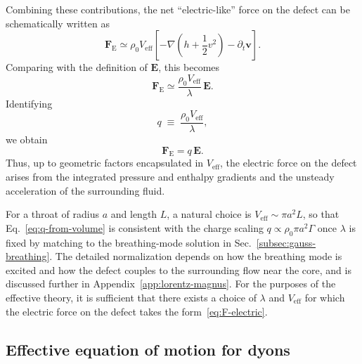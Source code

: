 \documentclass[11pt]{article}
\begin{document}
Combining these contributions, the net ``electric-like'' force on the defect can be schematically written as
\begin{equation}
\mathbf{F}_{\mathrm{E}}
\simeq \rho_0 V_{\mathrm{eff}}
\left[-\nabla\left(h + \frac{1}{2}v^2\right) - \partial_t \mathbf{v}\right].
\end{equation}
Comparing with the definition of $\mathbf{E}$, this becomes
\begin{equation}
\mathbf{F}_{\mathrm{E}}
\simeq \frac{\rho_0 V_{\mathrm{eff}}}{\lambda}\,\mathbf{E}.
\end{equation}
Identifying
\begin{equation}
q \;\equiv\; \frac{\rho_0 V_{\mathrm{eff}}}{\lambda},
\label{eq:q-from-volume}
\end{equation}
we obtain
\begin{equation}
\mathbf{F}_{\mathrm{E}} = q\,\mathbf{E}.
\label{eq:F-electric}
\end{equation}
Thus, up to geometric factors encapsulated in $V_{\mathrm{eff}}$, the electric force on the defect arises from the integrated pressure and enthalpy gradients and the unsteady acceleration of the surrounding fluid.

For a throat of radius $a$ and length $L$, a natural choice is $V_{\mathrm{eff}} \sim \pi a^2 L$, so that Eq.~\eqref{eq:q-from-volume} is consistent with the charge scaling $q \propto \rho_0 \pi a^2 \Gamma$ once $\lambda$ is fixed by matching to the breathing-mode solution in Sec.~\ref{subsec:gauss-breathing}.  The detailed normalization depends on how the breathing mode is excited and how the defect couples to the surrounding flow near the core, and is discussed further in Appendix~\ref{app:lorentz-magnus}.  For the purposes of the effective theory, it is sufficient that there exists a choice of $\lambda$ and $V_{\mathrm{eff}}$ for which the electric force on the defect takes the form~\eqref{eq:F-electric}.

\subsection{Effective equation of motion for dyons}
\end{document}
